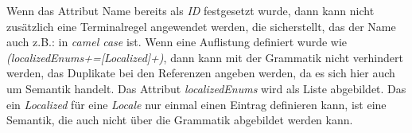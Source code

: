 \newline
\newline
Wenn das Attribut Name bereits als \emph{ID} festgesetzt wurde, dann kann nicht zusätzlich eine Terminalregel angewendet werden, die sicherstellt, das der Name auch z.B.: in \emph{camel case} ist. 
\newline
\newline
Wenn eine Auflistung definiert wurde wie \emph{(localizedEnums+=[Localized]+)}, dann kann mit der Grammatik nicht verhindert werden, das Duplikate bei den Referenzen angeben werden, da es sich hier auch um Semantik handelt. Das Attribut \emph{localizedEnums} wird als Liste abgebildet.
\newline
\newline
Das ein \emph{Localized} für eine \emph{Locale} nur einmal einen Eintrag definieren kann, ist eine Semantik, die auch nicht über die Grammatik abgebildet werden kann.